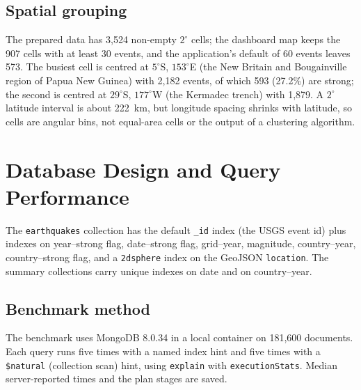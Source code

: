 \documentclass[11pt,a4paper]{article}
\begin{document}
\subsection{Spatial grouping}
The prepared data has 3,524 non-empty $2^\circ$ cells; the dashboard map keeps the 907 cells with at least 30 events, and the application's default of 60 events leaves 573. The busiest cell is centred at $5^\circ$S, $153^\circ$E (the New Britain and Bougainville region of Papua New Guinea) with 2,182 events, of which 593 (27.2\%) are strong; the second is centred at $29^\circ$S, $177^\circ$W (the Kermadec trench) with 1,879. A $2^\circ$ latitude interval is about 222~km, but longitude spacing shrinks with latitude, so cells are angular bins, not equal-area cells or the output of a clustering algorithm.

\section{Database Design and Query Performance}
The \texttt{earthquakes} collection has the default \texttt{\_id} index (the USGS event id) plus indexes on year--strong flag, date--strong flag, grid--year, magnitude, country--year, country--strong flag, and a \texttt{2dsphere} index on the GeoJSON \texttt{location}. The summary collections carry unique indexes on date and on country--year.

\subsection{Benchmark method}
The benchmark uses MongoDB 8.0.34 in a local container on 181,600 documents. Each query runs five times with a named index hint and five times with a \texttt{\$natural} (collection scan) hint, using \texttt{explain} with \texttt{executionStats}. Median server-reported times and the plan stages are saved.\cite{mongoexplain}
\end{document}
